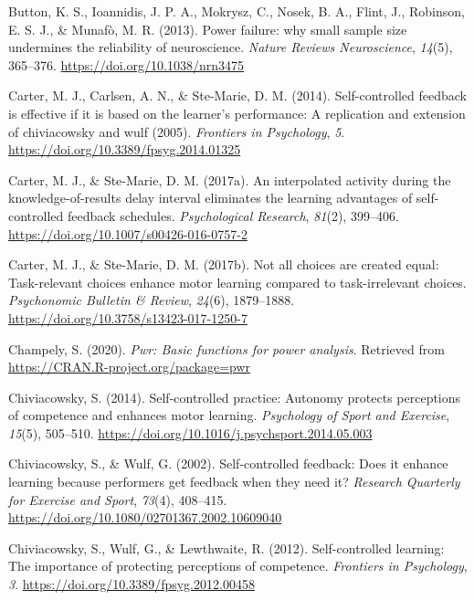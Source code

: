 \documentclass[
  english,
  doc, donotrepeattitle,floatsintext]{apa7}
\newlength{\cslhangindent}
\newlength{\cslentryspacingunit} %
\newenvironment{CSLReferences}[2] %
 {%
  \setlength{\parindent}{0pt}
  \ifodd #1
  \let\oldpar\par
  \def\par{\hangindent=\cslhangindent\oldpar}
  \fi
  \setlength{\parskip}{#2\cslentryspacingunit}
 }%
 {}
\begin{document}
\begin{CSLReferences}{1}{0}
\leavevmode{}%
Button, K. S., Ioannidis, J. P. A., Mokrysz, C., Nosek, B. A., Flint, J., Robinson, E. S. J., \& Munafò, M. R. (2013). Power failure: why small sample size undermines the reliability of neuroscience. \emph{Nature Reviews Neuroscience}, \emph{14}(5), 365--376. \url{https://doi.org/10.1038/nrn3475}

\leavevmode{}%
Carter, M. J., Carlsen, A. N., \& Ste-Marie, D. M. (2014). Self-controlled feedback is effective if it is based on the learner{'}s performance: A replication and extension of chiviacowsky and wulf (2005). \emph{Frontiers in Psychology}, \emph{5}. \url{https://doi.org/10.3389/fpsyg.2014.01325}

\leavevmode{}%
Carter, M. J., \& Ste-Marie, D. M. (2017a). An interpolated activity during the knowledge-of-results delay interval eliminates the learning advantages of self-controlled feedback schedules. \emph{Psychological Research}, \emph{81}(2), 399--406. \url{https://doi.org/10.1007/s00426-016-0757-2}

\leavevmode{}%
Carter, M. J., \& Ste-Marie, D. M. (2017b). Not all choices are created equal: Task-relevant choices enhance motor learning compared to task-irrelevant choices. \emph{Psychonomic Bulletin \& Review}, \emph{24}(6), 1879--1888. \url{https://doi.org/10.3758/s13423-017-1250-7}

\leavevmode{}%
Champely, S. (2020). \emph{Pwr: Basic functions for power analysis}. Retrieved from \url{https://CRAN.R-project.org/package=pwr}

\leavevmode{}%
Chiviacowsky, S. (2014). Self-controlled practice: Autonomy protects perceptions of competence and enhances motor learning. \emph{Psychology of Sport and Exercise}, \emph{15}(5), 505--510. \url{https://doi.org/10.1016/j.psychsport.2014.05.003}

\leavevmode{}%
Chiviacowsky, S., \& Wulf, G. (2002). Self-controlled feedback: Does it enhance learning because performers get feedback when they need it? \emph{Research Quarterly for Exercise and Sport}, \emph{73}(4), 408--415. \url{https://doi.org/10.1080/02701367.2002.10609040}

\leavevmode{}%
Chiviacowsky, S., Wulf, G., \& Lewthwaite, R. (2012). Self-controlled learning: The importance of protecting perceptions of competence. \emph{Frontiers in Psychology}, \emph{3}. \url{https://doi.org/10.3389/fpsyg.2012.00458}


\end{CSLReferences}
\end{document}
